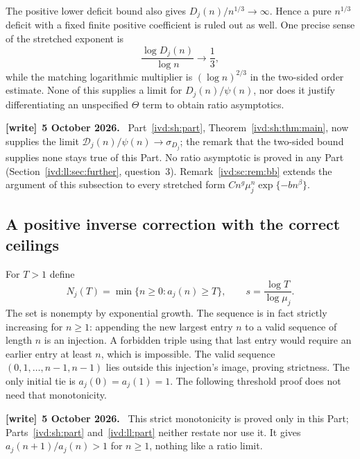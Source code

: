 \documentclass[11pt,letterpaper]{article}
\theoremstyle{remark}\newtheorem{remark}[theorem]{Remark}
\numberwithin{equation}{section}
\newcommand{\Dfc}{\mathcal D}
\newenvironment{writenote}[1][]{\par\smallskip\begingroup\small
 \noindent\textbf{[write]}\if\relax\detokenize{#1}\relax\else~\textbf{#1.}\fi\ }%
 {\par\endgroup\smallskip}
\begin{document}
The positive lower deficit bound also gives
$D_j(n)/n^{1/3}\to\infty$. Hence a pure $n^{1/3}$ deficit with a
fixed finite positive coefficient is ruled out as well. One precise
sense of the stretched exponent is
\[
 \frac{\log D_j(n)}{\log n}\longrightarrow\frac13,
\]
while the matching logarithmic multiplier is $(\log n)^{2/3}$ in the
two-sided order estimate. None of this supplies a limit for
$D_j(n)/\psi(n)$, nor does it justify differentiating an unspecified
$\Theta$ term to obtain ratio asymptotics.

\begin{writenote}[5 October 2026]
Part~\ref{ivd:sh:part}, Theorem~\ref{ivd:sh:thm:main}, now supplies the limit $\Dfc_j(n)/\psi(n)\to\sigma_{D_j}$; the remark that the two-sided bound supplies none stays true of this Part. No ratio asymptotic is proved in any Part (Section~\ref{ivd:ll:sec:further}, question~3). Remark~\ref{ivd:sc:rem:bb} extends the argument of this subsection to every stretched form $Cn^g\mu_j^n\exp\{-bn^\beta\}$.
\end{writenote}

\subsection{A positive inverse correction with the correct ceilings}\label{ivd:sc:sub:inverse}
For $T>1$ define
\[
 N_j(T)=\min\{n\ge0:a_j(n)\ge T\},\qquad
 s=\frac{\log T}{\log\mu_j}.
\]
The set is nonempty by exponential growth. The sequence is in fact
strictly increasing for $n\ge1$: appending the new largest entry $n$
to a valid sequence of length $n$ is an injection. A forbidden triple
using that last entry would require an earlier entry at least $n$,
which is impossible. The valid sequence
$(0,1,\ldots,n-1,n-1)$ lies outside this injection's image, proving
strictness. The only initial tie is $a_j(0)=a_j(1)=1$.
The following threshold proof does not need that monotonicity.
\begin{writenote}[5 October 2026]
This strict monotonicity is proved only in this Part; Parts~\ref{ivd:sh:part} and~\ref{ivd:ll:part} neither restate nor use it. It gives $a_j(n+1)/a_j(n)>1$ for $n\ge1$, nothing like a ratio limit.
\end{writenote}
\end{document}
